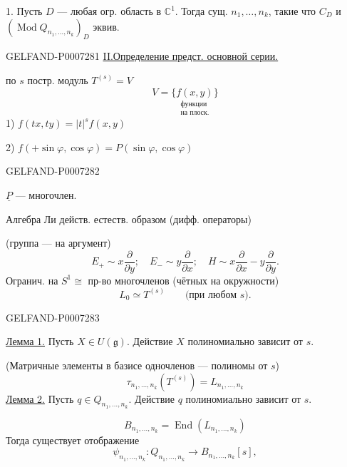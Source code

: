 1. Пусть \(D\) --- любая огр. область в \(\mathbb C^1\).
Тогда сущ. \(n_1,\ldots,n_k\), такие что \(C_D\) и
\((\operatorname{Mod} Q_{n_1,\ldots,n_k})_D\) эквив.


\begin{GelfandAdjacentEvidence}{GELFAND-P000728}{1}
\underline{II.}\quad \underline{Определение предст. основной серии.}

по \(s\) постр. модуль \(T^{(s)}=V\)
\[
V=\{\underset{\substack{\text{функции}\\\text{на плоск.}}}{f(x,y)}\}
\]
1) \(f(tx,ty)=|t|^sf(x,y)\)

2) \(f(+\sin\varphi,\cos\varphi)=P(\sin\varphi,\cos\varphi)\)
\end{GelfandAdjacentEvidence}
\begin{GelfandAdjacentEvidence}{GELFAND-P000728}{2}


\(\underline{P}\) --- многочлен.

Алгебра Ли действ. естеств. образом (дифф. операторы)

(группа --- на аргумент)
\[
E_+\sim x\frac{\partial}{\partial y};\quad
E_-\sim y\frac{\partial}{\partial x};\quad
H\sim x\frac{\partial}{\partial x}-y\frac{\partial}{\partial y}.
\]
Огранич. на \(S^1\cong{}\) пр-во многочленов (чётных на окружности)
\[
L_0\simeq T^{(s)}\qquad\text{(при любом }s\text{).}
\]
\end{GelfandAdjacentEvidence}
\begin{GelfandAdjacentEvidence}{GELFAND-P000728}{3}


\underline{Лемма 1.} Пусть \(X\in U(\mathfrak g)\). Действие \(X\) полиномиально зависит от \(s\).

(Матричные элементы в базисе одночленов --- полиномы от \(s\))
\[
\tau_{n_1,\ldots,n_k}(T^{(s)})=L_{n_1,\ldots,n_k}
\]
\underline{Лемма 2.} Пусть \(q\in Q_{n_1,\ldots,n_k}\). Действие \(q\) полиномиально зависит от \(s\).

\quad {}
\[
B_{n_1,\ldots,n_k}=\operatorname{End}(L_{n_1,\ldots,n_k})
\]
Тогда существует отображение
\[
\psi_{n_1,\ldots,n_k}:
Q_{n_1,\ldots,n_k}\longrightarrow B_{n_1,\ldots,n_k}[s],
\]
\end{GelfandAdjacentEvidence}

